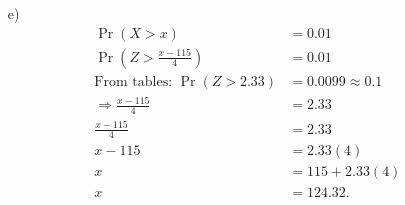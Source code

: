 \documentclass[12pt]{article}
\begin{document}
{\begin{minipage}[t]{0.98\textwidth}
\begin{minipage}[t]{0.47\textwidth}
\begin{enumerate}
\begin{align*}
\Pr(100 &< \,X < 110) \\
&= \Pr(X > 100) - \Pr(X > 110)\\
&=\Pr(Z > \tfrac{100-115}{4}) - \Pr(Z > \tfrac{110-115}{4}) \\
&=\Pr(Z > -3.75) - \Pr(Z > -1.25) \\
&=\Pr(Z < 3.75) - \Pr(Z < 1.25) \\
&= (1 - 0.000088) - (1-0.1056)\\
&=  0.999912 - 0.8944\\
&= 0.1055.
\end{align*}
\item[e)] \quad\\[-1.45cm]
\begin{align*}
\Pr(X > x) &= 0.01 \\
\Pr(Z > \tfrac{x-115}{4}) &= 0.01 \\[0.2cm]
\text{From tables: } \Pr(Z > 2.33) &= 0.0099 \approx 0.1 \\[0.2cm]
\Rightarrow \frac{x-115}{4} &= 2.33 \\
\frac{x-115}{4} &= 2.33 \\
x-115 &= 2.33(4) \\
x &= 115 +2.33(4) \\
x &=  124.32.
\end{align*}
\end{enumerate}
\end{minipage}
\end{minipage}}\vspace{0.03\textwidth}
\end{document}
